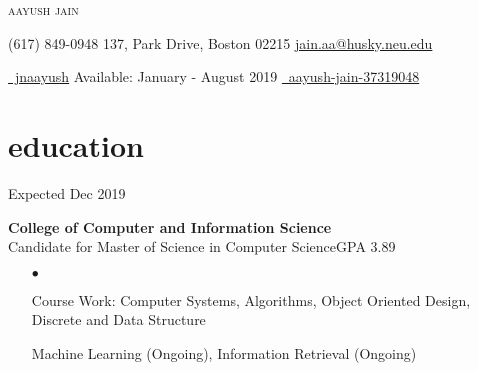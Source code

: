 \documentclass[a4paper, 10pt, oneside]{article}
\begin{document}

\begin{center}
\color{headings}\textsc{\Huge{{aayush jain}}} \\
\vspace{0.0em}
\raggedright \color{text1}{\Large\Telefon} (617) 849-0948 \hspace{12em}137, Park Drive, Boston 02215 \hspace{7.3em} {\Large\Letter} \href{mailto:jain.aa@husky.neu.edu}{jain.aa@husky.neu.edu} 

\vspace{-0.0em}
\raggedright
{\Large\faGithub} \href{https://github.com/jnaayush}{\ jnaayush}
\hspace{13.25em} {\selectfont Available: January - August 2019}  
\hspace{6.8em}  {\Large\faLinkedin} \href{https://www.linkedin.com/in/aayush-jain-37319048/}{\ aayush-jain-37319048}

\vspace{-0.3em}
\section{\color{headings} education}
\vspace{-0.5em}
 \hfill {Expected Dec 2019}\\
\raggedright \textbf{College of Computer and Information Science}\\
Candidate for Master of Science in Computer Science\hfill {GPA 3.89}\\
\begin{itemize}
\vspace{-0.7em}
\item[$\bullet$]\raggedright{Course Work:} Computer Systems, Algorithms, Object Oriented Design, Discrete and Data Structure
\vspace{-0.7em}
\item[] Machine Learning (Ongoing), Information Retrieval (Ongoing) \\
\end{itemize}


\end{center}
\end{document}
